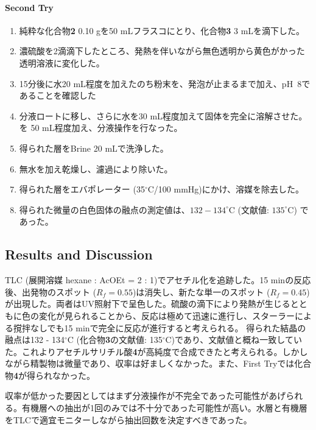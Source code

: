 \documentclass{ltjsarticle}
\theoremstyle{definition}
\numberwithin{equation}{section}
\newcommand{\D}{^\circ\text{C}}
\begin{document}
\paragraph{Second Try}
\begin{enumerate}
\item 純粋な化合物\textbf{2} 0.10 gを50 mLフラスコにとり、化合物\textbf{3} 3 mLを滴下した。
\item 濃硫酸を2滴滴下したところ、発熱を伴いながら無色透明から黄色がかった透明溶液に変化した。
\item 15分後に水20 mL程度を加えたのち粉末を、発泡が止まるまで加え、pH~8であることを確認した
\item 分液ロートに移し、さらに水を30 mL程度加えて固体を完全に溶解させた。を 50 mL程度加え、分液操作を行なった。
\item 得られた層をBrine 20 mLで洗浄した。
\item 無水を加え乾燥し、濾過により除いた。
\item 得られた層をエバポレーター (35$\D$/100 mmHg)にかけ、溶媒を除去した。
\item 得られた微量の白色固体の融点の測定値は、$132-134\D$ (文献値: $135\D$) であった。
\end{enumerate}
\subsection{Results and Discussion}
TLC (展開溶媒 hexane : AcOEt = 2 : 1)でアセチル化を追跡した。15 minの反応後、出発物のスポット ($R_f = 0.55$)は消失し、新たな単一のスポット ($R_f = 0.45$) が出現した。両者はUV照射下で呈色した。硫酸の滴下により発熱が生じるとともに色の変化が見られることから、反応は極めて迅速に進行し、スターラーによる撹拌なしでも15 minで完全に反応が進行すると考えられる。
得られた結晶の融点は132 - 134$\D$ (化合物\textbf{3}の文献値: 135$\D$)であり、文献値と概ね一致していた。これよりアセチルサリチル酸\textbf{4}が高純度で合成できたと考えられる。しかしながら精製物は微量であり、収率は好ましくなかった。また、First Tryでは化合物\textbf{4}が得られなかった。

収率が低かった要因としてはまず分液操作が不完全であった可能性があげられる。有機層への抽出が1回のみでは不十分であった可能性が高い。水層と有機層をTLCで適宜モニターしながら抽出回数を決定すべきであった。
\end{document}
